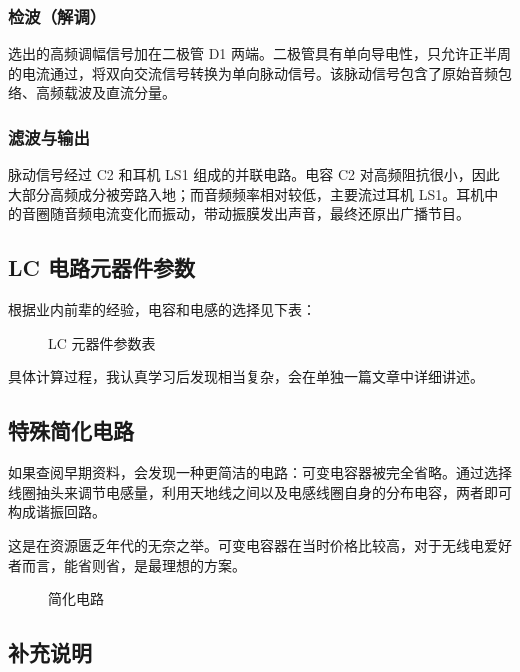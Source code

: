 \documentclass[12pt,UTF8]{ctexbook}
\begin{document}
\subsubsection{检波（解调）}

选出的高频调幅信号加在二极管 D1 两端。二极管具有单向导电性，只允许正半周的电流通过，将双向交流信号转换为单向脉动信号。该脉动信号包含了原始音频包络、高频载波及直流分量。

\subsubsection{滤波与输出}

脉动信号经过 C2 和耳机 LS1 组成的并联电路。电容 C2 对高频阻抗很小，因此大部分高频成分被旁路入地；而音频频率相对较低，主要流过耳机 LS1。耳机中的音圈随音频电流变化而振动，带动振膜发出声音，最终还原出广播节目。

\subsection{LC 电路元器件参数}

根据业内前辈的经验，电容和电感的选择见下表：

\begin{figure}[H]
	\centering
	\caption{LC 元器件参数表}
	\label{fig:lc-parameters}
\end{figure}

具体计算过程，我认真学习后发现相当复杂，会在单独一篇文章中详细讲述。

\subsection{特殊简化电路}

如果查阅早期资料，会发现一种更简洁的电路：可变电容器被完全省略。通过选择线圈抽头来调节电感量，利用天地线之间以及电感线圈自身的分布电容，两者即可构成谐振回路。

这是在资源匮乏年代的无奈之举。可变电容器在当时价格比较高，对于无线电爱好者而言，能省则省，是最理想的方案。

\begin{figure}[H]
	\centering
	\caption{简化电路}
	\label{fig:simplified-circuit}
\end{figure}

\subsection{补充说明}
\end{document}
